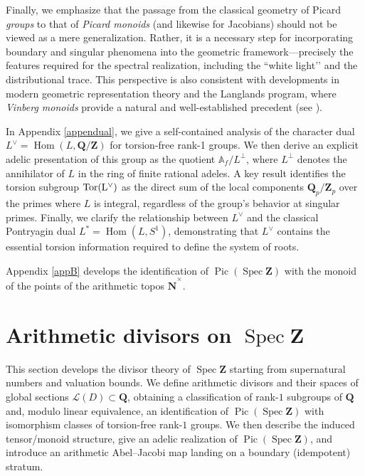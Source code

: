 \documentclass[11pt,a4paper]{article}
\newcommand{\Q}{\mathbf{Q}}
\newcommand{\Z}{\mathbf{Z}}
\newcommand{\N}{\mathbf{N}}
\newcommand{\A}{\mathbb{A}}
\def\N{{\mathbf N}}
\def\nat{\widehat{\N}^\times}
\def\spz{\Spec \Z}
\newcommand{\Spec}{\operatorname{Spec}}
\def\Pic{\operatorname{Pic}}
\def\spz{\Spec \Z}
\theoremstyle{plain}
\theoremstyle{definition} %
\begin{document}
Finally, we emphasize that the passage from the classical geometry of Picard \emph{groups} to that of \emph{Picard monoids} (and likewise for Jacobians) should not be viewed as a mere generalization. Rather, it is a necessary step for incorporating boundary and singular phenomena into the geometric framework—precisely the features required for the spectral realization, including the ``white light’’ and the distributional trace. This perspective is also consistent with developments in modern geometric representation theory and the Langlands program, where \emph{Vinberg monoids} provide a natural and well-established precedent (see \cite{Vinberg, Ngo}).
\vspace{.08in}

In Appendix \ref{appendual}, we give a self-contained analysis of the character dual $L^\vee = \operatorname{Hom}(L, \Q/\Z)$ for torsion-free rank-1 groups. We then derive an explicit adelic presentation of this group as the quotient $\A_f / L^\perp$, where $L^\perp$ denotes the annihilator of $L$ in the ring of finite rational adeles. A key result identifies the torsion subgroup $\rm{Tor}(L^\vee)$ as the direct sum of the local components $\Q_p/\Z_p$ over the primes where $L$ is integral, regardless of the group's behavior at singular primes. Finally, we clarify the relationship between $L^\vee$ and the classical Pontryagin dual $L^* = \operatorname{Hom}(L, S^1)$, demonstrating that $L^\vee$ contains the essential torsion information required to define the system of roots.

Appendix \ref{appB} develops the identification of $\Pic(\spz)$   with the monoid of the points of the arithmetic topos $\nat$.


\section{Arithmetic divisors on $\spz$}\label{gendiv}

This section develops the divisor theory of $\spz$ starting from supernatural numbers
and valuation bounds. We define arithmetic divisors and their spaces of global
sections $\mathcal L(D)\subset\Q$, obtaining a classification of rank-$1$ subgroups
of $\Q$ and, modulo linear equivalence, an identification of $\Pic(\spz)$ with
isomorphism classes of torsion-free rank-$1$ groups. We then describe the induced
tensor/monoid structure, give an adelic realization of $\Pic(\spz)$, and introduce an
arithmetic Abel--Jacobi map landing on a boundary (idempotent) stratum.
\end{document}
